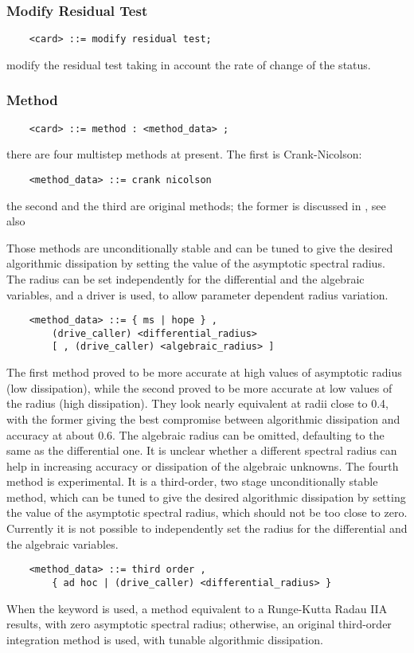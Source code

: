 \subsubsection{Modify Residual Test}
\begin{verbatim}
    <card> ::= modify residual test;
\end{verbatim}
modify the residual test taking in account the rate of change of the status.

\subsubsection{Method}
\begin{verbatim}
    <card> ::= method : <method_data> ;
\end{verbatim}
there are four multistep methods at present. 
The first is Crank-Nicolson:
\begin{verbatim}
    <method_data> ::= crank nicolson
\end{verbatim}
the second and the third are original 
methods; the former is discussed in \cite{MASARATI-LANZ-MANTEGAZZA-2001},
see also
\begin{quote}
\end{quote} 
Those methods are unconditionally stable and can be tuned to give 
the desired algorithmic dissipation
by setting the value of the asymptotic spectral radius.
The radius can be set independently for the differential
and the algebraic variables, and a driver is used, to allow parameter 
dependent radius variation.
\begin{verbatim}
    <method_data> ::= { ms | hope } ,
        (drive_caller) <differential_radius>
        [ , (drive_caller) <algebraic_radius> ]
\end{verbatim}
The first method proved to be more accurate at high values of asymptotic
radius (low dissipation), while the second proved to be more accurate
at low values of the radius (high dissipation).
They look nearly equivalent at radii close to 0.4, with the former
giving the best compromise between algorithmic dissipation and accuracy 
at about 0.6.
The algebraic radius can be omitted, defaulting to the same 
as the differential one.
It is unclear whether a different spectral radius can help in increasing
accuracy or dissipation of the algebraic unknowns.
The fourth method is experimental. It is a third-order,
two stage unconditionally stable method, which can be tuned to give 
the desired algorithmic dissipation by setting the value 
of the asymptotic spectral radius, which should not be 
too close to zero.
Currently it is not possible to independently set the radius 
for the differential and the algebraic variables.
\begin{verbatim}
    <method_data> ::= third order ,
        { ad hoc | (drive_caller) <differential_radius> }
\end{verbatim}
When the keyword  is used, a method equivalent
to a Runge-Kutta Radau IIA results, with zero asymptotic
spectral radius; otherwise, an original third-order
integration method is used, with tunable algorithmic dissipation.

